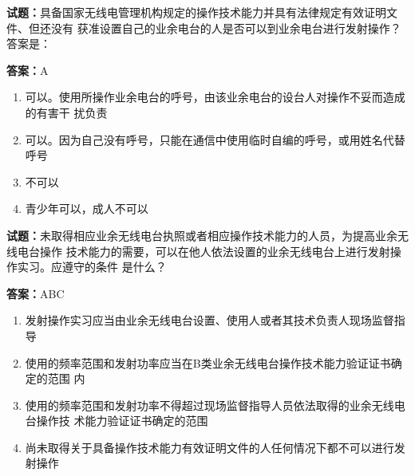 \documentclass{ctexbook}
\begin{document}
\vspace{1em}

\textbf{试题：}具备国家无线电管理机构规定的操作技术能力并具有法律规定有效证明文件、但还没有
获准设置自己的业余电台的人是否可以到业余电台进行发射操作？答案是： 

\textbf{答案：}A 


\begin{enumerate}[leftmargin=3em]
  \item 可以。使用所操作业余电台的呼号，由该业余电台的设台人对操作不妥而造成的有害干
扰负责 

  \item 可以。因为自己没有呼号，只能在通信中使用临时自编的呼号，或用姓名代替呼号 

  \item 不可以 

  \item 青少年可以，成人不可以 

\end{enumerate}





\vspace{1em}

\textbf{试题：}未取得相应业余无线电台执照或者相应操作技术能力的人员，为提高业余无线电台操作
技术能力的需要，可以在他人依法设置的业余无线电台上进行发射操作实习。应遵守的条件
是什么？ 

\textbf{答案：}ABC 

\begin{enumerate}[leftmargin=3em]
  \item 发射操作实习应当由业余无线电台设置、使用人或者其技术负责人现场监督指导 

  \item 使用的频率范围和发射功率应当在B类业余无线电台操作技术能力验证证书确定的范围
内 

  \item 使用的频率范围和发射功率不得超过现场监督指导人员依法取得的业余无线电台操作技
术能力验证证书确定的范围 

  \item 尚未取得关于具备操作技术能力有效证明文件的人任何情况下都不可以进行发射操作 

\end{enumerate}



\end{document}
